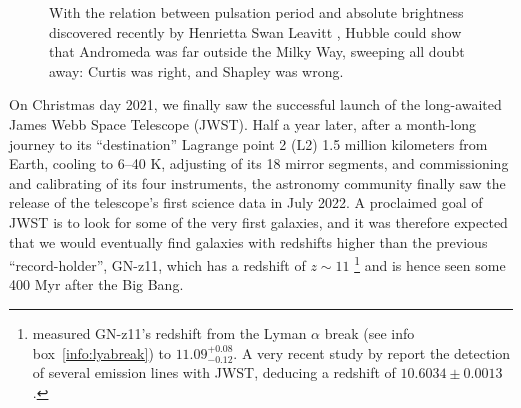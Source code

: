 \documentclass[useAMS]{aa}
\begin{document}
\begin{figure}[!t]
\begin{bclogo}[
    couleur=gray!20,
    epBord=1,
    arrondi=0.1,
    logo=\bcinfo,
    marge=8,
    ombre=false, %
    couleurBord=gray!60,
    barre=line]
{{    With the relation between pulsation period and absolute brightness discovered recently by Henrietta Swan Leavitt \citep{Leavitt1908}, Hubble could show that Andromeda was far outside the Milky Way, sweeping all doubt away: Curtis was right, and Shapley was wrong.
    }}
\label{info:debate}
\end{bclogo}
     \endminipage
\end{figure}

On Christmas day 2021, we finally saw the successful launch of the long-awaited James Webb Space Telescope (JWST).
Half a year later, after a month-long journey to its ``destination'' Lagrange point 2 (L2) 1.5 million kilometers from Earth, cooling to 6--40 K, adjusting of its 18 mirror segments, and commissioning and calibrating of its four instruments, the astronomy community finally saw the release of the telescope's first science data in July 2022.
A proclaimed goal of JWST is to look for some of the very first galaxies, and it was therefore expected that we would eventually find galaxies with redshifts higher than the previous ``record-holder'', GN-z11, which has a redshift of $z\sim11$ \citep{Oesch2016}\footnote{\citet{Oesch2016} measured GN-z11's redshift from the Lyman $\alpha$ break (see info box~\ref{info:lyabreak}) to $11.09_{-0.12}^{+0.08}$. A very recent study by \citet{Bunker2023} report the detection of several emission lines with JWST, deducing a redshift of $10.6034\pm0.0013$.} and is hence seen some 400 Myr after the Big Bang.
\end{document}
